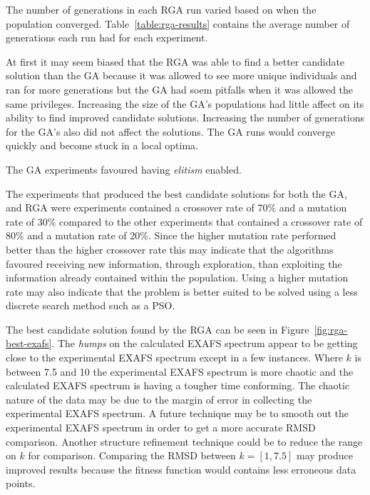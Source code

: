 The number of generations in each RGA run varied based on when the population converged. Table~\ref{table:rga-results} contains the average number of generations each run had for each experiment.

At first it may seem biased that the RGA was able to find a better candidate solution than the GA because it was allowed to see more unique individuals and ran for more generations but the GA had soem pitfalls when it was allowed the same privileges. Increasing the size of the GA's populations had little affect on its ability to find improved candidate solutions. Increasing the number of generations for the GA's also did not affect the solutions. The GA runs would converge quickly and become stuck in a local optima.

The GA experiments favoured having \textit{elitism} enabled.

The experiments that produced the best candidate solutions for both the GA, and RGA were experiments contained a crossover rate of 70\% and a mutation rate of 30\% compared to the other experiments that contained a crossover rate of 80\% and a mutation rate of 20\%. Since the higher mutation rate performed better than the higher crossover rate this may indicate that the algorithms favoured receiving new information, through exploration, than exploiting the information already contained within the population. Using a higher mutation rate may also indicate that the problem is better suited to be solved using a less discrete search method such as a PSO.

The best candidate solution found by the RGA can be seen in Figure~\ref{fig:rga-best-exafs}. The \textit{humps} on the calculated EXAFS spectrum appear to be getting close to the experimental EXAFS spectrum except in a few instances. Where $k$ is between 7.5 and 10 the experimental EXAFS spectrum is more chaotic and the calculated EXAFS spectrum is having a tougher time conforming. The chaotic nature of the data may be due to the margin of error in collecting the experimental EXAFS spectrum. A future technique may be to smooth out the experimental EXAFS spectrum in order to get a more accurate RMSD comparison. Another structure refinement technique could be to reduce the range on $k$ for comparison. Comparing the RMSD between $k = [1,7.5]$ may produce improved results because the fitness function would contains less erroneous data points.


